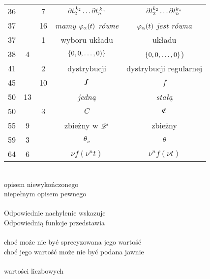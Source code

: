 \documentclass[a4paper,11pt]{article}
\begin{document}
\begin{center}
\begin{tabular}{|c|c|c|c|c|}
    36  & &  7 & $\partial t_{ 2 }^{ \: k_{ 2 } } \ldots \partial t_{ n }^{ \: k_{ n } }$
           & $\partial t_{ 2 }^{ k_{ 2 } } \ldots \partial t_{ n }^{ k_{ n } }$ \\
    37  & & 16 & \emph{mamy $\varphi_{ \alpha }( t )$ równe}
           & \emph{$\varphi_{ \alpha }( t )$ jest równa} \\
    37  & &  1 & wyboru układu & układu \\
    38  &  4 & & $\{ 0, 0, \ldots, 0 ) \}$ & $\{ 0, 0, \ldots, 0 \}$) \\
    41  & &  2 & dystrybucji & dystrybucji regularnej \\
    45  & & 10 & $\boldsymbol{f}$ & $f$ \\
    50  & 13 & & \emph{jedną} & \emph{stałą} \\
    50  & &  3 & $C$ & $\mathfrak{C}$ \\
    55  &  9 & & zbieżny w $\mathcal{D}'$ & zbieżny \\
    59  &  3 & & $\theta_{ \nu }$ & $\theta$ \\
    64  &  6 & & $\nu f( \nu^{ n } t )$ & $\nu^{ n } f( \nu t )$ \\
    \hline
  \end{tabular}
\end{center}
\noi {} \\
\Jest opisem niewykończonego \\
\Pow niepełnym opisem pewnego \\
 \\
\Jest Odpowiednie nachylenie wskazuje \\
\Pow Odpowiednią funkcje przedstawia \\
 \\
\Jest choć może nie być sprecyzowana jego wartość \\
\Pow choć jego wartość może nie być podana jawnie \\
 \\
\Jest wartości liczbowych \\
\end{document}
